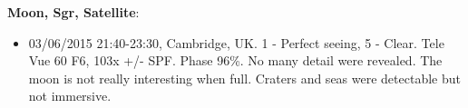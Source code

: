 {\bf Moon, Sgr, Satellite}:
\begin{itemize}
\item 03/06/2015 21:40-23:30, Cambridge, UK. 1 - Perfect seeing, 5 - Clear. Tele Vue 60 F6, 103x +/- SPF. Phase 96\%. No many detail were revealed. The moon is not really interesting when full. Craters and seas were detectable but not immersive. 
\end{itemize}
